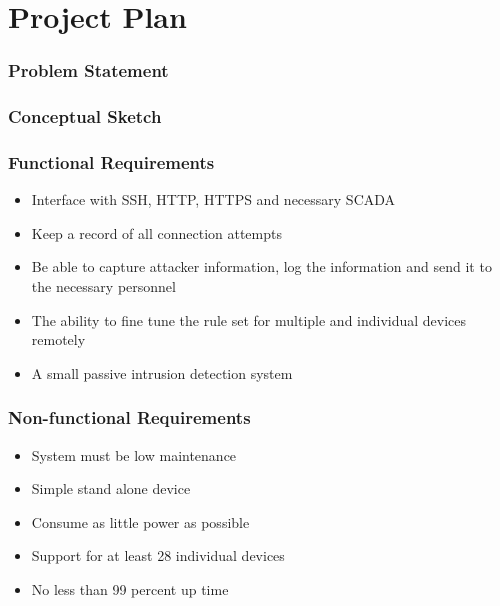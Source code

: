 \section{Project Plan}

\begin{frame}
\frametitle{Problem Statement}


\end{frame}

\begin{frame}
\frametitle{Conceptual Sketch}


\end{frame}

\begin{frame}
\frametitle{Functional Requirements}

\begin{itemize}
\item Interface with SSH, HTTP, HTTPS and necessary SCADA 
\item Keep a record of all connection attempts
\item Be able to capture attacker information, log the information  and send it to the necessary personnel 
\item The ability to fine tune the rule set for multiple and individual devices remotely 
\item A small passive intrusion detection system 
\end{itemize}

\end{frame}

\begin{frame}
\frametitle{Non-functional Requirements}

\begin{itemize}
\item System must be low maintenance
\item Simple stand alone device
\item Consume as little power as possible
\item Support for at least 28 individual devices
\item No less than 99 percent up time
\end{itemize}

\end{frame}

